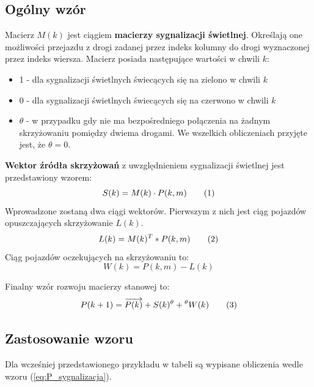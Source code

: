 \documentclass[12pt]{book}
\theoremstyle{plain}
\newcommand\addtag{\refstepcounter{equation}
\renewcommand{\labelenumii}{\theenumii}
\renewcommand{\theenumii}{\theenumi.\arabic{enumii}.}
\tag{\theequation}}
\begin{document}
\subsection{Ogólny wzór}
\begin{tcolorbox}
Macierz $M(k)$ jest ciągiem \textbf{macierzy sygnalizacji świetlnej}. Określają one możliwości przejazdu z drogi zadanej przez indeks kolumny do drogi wyznaczonej przez indeks wiersza. Macierz posiada następujące wartości w chwili $k$:
\begin{itemize}
\item 1 - dla sygnalizacji świetlnych świecących się na zielono w chwili $k$
\item 0 - dla sygnalizacji świetlnych świecących się na czerwono w chwili $k$
\item $\theta$ - w przypadku gdy nie ma bezpośredniego połączenia na żadnym skrzyżowaniu pomiędzy dwiema drogami. We wszelkich obliczeniach przyjęte jest, że $\theta=0$.
\end{itemize} 
\textbf{Wektor źródła skrzyżowań}  z uwzględnieniem sygnalizacji świetlnej jest przedstawiony wzorem:
\[S(k)=M(k) \cdot P(k,m) \addtag \label{eq:S} \]
Wprowadzone zostaną dwa ciągi wektorów.
Pierwszym z nich jest ciąg pojazdów opuszczających skrzyżowanie $L(k)$.
\[L(k)=M(k)^T * P(k,m) \addtag \]
Ciąg pojazdów oczekujących na skrzyżowaniu to:
\[
W(k)=P(k,m)-L(k)
\]

Finalny wzór rozwoju macierzy stanowej to:
\[P(k+1)=\overrightarrow{P(k)} + S(k)^{\theta} + {^\theta W(k)} \addtag \label{eq:P_sygnalizacja}\]
\end{tcolorbox}
\newpage 
\subsection{Zastosowanie wzoru}
Dla wcześniej przedstawionego przykładu w tabeli są wypisane obliczenia wedle wzoru (\ref{eq:P_sygnalizacja}).
\end{document}
